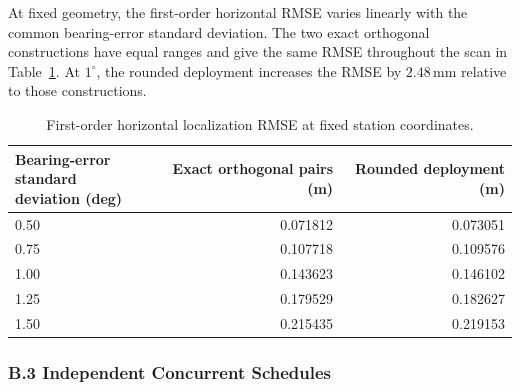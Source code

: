 \documentclass{swmcmthesis}
\begin{document}
At fixed geometry, the first-order horizontal RMSE varies linearly with the common bearing-error standard deviation. The two exact orthogonal constructions have equal ranges and give the same RMSE throughout the scan in Table~\ref{tab:q21-alternative-noise}. At \(1^\circ\), the rounded deployment increases the RMSE by \(2.48\,\mathrm{mm}\) relative to those constructions.

\begin{table}[!htbp]
    \centering
    \caption{First-order horizontal localization RMSE at fixed station coordinates.}
    \label{tab:q21-alternative-noise}
    \begin{tabular}{@{}lrr@{}}
        \toprule
        \shortstack[l]{Bearing-error standard\\deviation (deg)} & Exact orthogonal pairs (m) & Rounded deployment (m) \\
        \midrule
        0.50 & 0.071812 & 0.073051 \\
        0.75 & 0.107718 & 0.109576 \\
        1.00 & 0.143623 & 0.146102 \\
        1.25 & 0.179529 & 0.182627 \\
        1.50 & 0.215435 & 0.219153 \\
        \bottomrule
    \end{tabular}
\end{table}

\subsubsection*{B.3 Independent Concurrent Schedules}
\label{app:q22-alternatives}
\end{document}
